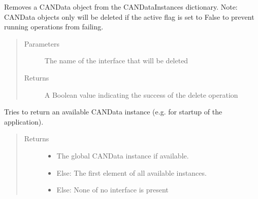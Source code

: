 \documentclass[letterpaper,10pt,english]{sphinxmanual}
\begin{document}
\begin{fulllineitems}
\begin{fulllineitems}
\begin{quote}
\begin{description}
\end{description}\end{quote}

\end{fulllineitems}


\begin{fulllineitems}
\label{\detokenize{src:src.CANData.CANData.deleteCANDataInstance}}
Removes a CANData object from the CANDataInstances dictionary.
Note: CANData objects only will be deleted if the active flag is set to False
to prevent running operations from failing.
\begin{quote}\begin{description}
\item[{Parameters}] \leavevmode
{} \textendash{} The name of the interface that will be deleted

\item[{Returns}] \leavevmode
A Boolean value indicating the success of the delete operation

\end{description}\end{quote}

\end{fulllineitems}


\begin{fulllineitems}
\label{\detokenize{src:src.CANData.CANData.getGlobalOrFirstInstance}}
Tries to return an available CANData instance (e.g. for startup of the application).
\begin{quote}\begin{description}
\item[{Returns}] \leavevmode
\begin{itemize}
\item {} 
The global CANData instance if available.

\item {} 
Else: The first element of all available instances.

\item {} 
Else: None of no interface is present


\end{itemize}
\end{description}
\end{quote}
\end{fulllineitems}
\end{fulllineitems}
\end{document}

